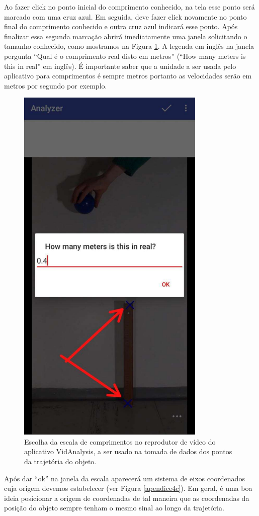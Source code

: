 \documentclass[12pt]{article}
\begin{document}
 Ao fazer click no ponto inicial do comprimento conhecido, na tela esse ponto será marcado com uma cruz azul. Em seguida, deve fazer click novamente no ponto final do comprimento conhecido e outra cruz azul indicará esse ponto. Após finalizar essa segunda marcação abrirá imediatamente uma janela solicitando o tamanho conhecido, como mostramos na Figura \ref{apendice3c}. A legenda em inglês na janela pergunta ``Qual é o comprimento real disto em metros'' (``How many meters is this in real'' em inglês). É importante saber que a unidade a ser usada pelo aplicativo para comprimentos é sempre metros portanto as velocidades serão em metros por segundo por exemplo.
\begin{figure}[h!]
\includegraphics[width=9cm]{imagenapendicec3.pdf}
\caption{Escolha da escala de comprimentos no reprodutor de vídeo do aplicativo VidAnalysis, a ser usado na tomada de dados dos pontos da trajetória do objeto.}
\label{apendice3c}
\end{figure}
Após dar ``ok'' na janela da escala aparecerá um sistema de eixos coordenados cuja origem devemos estabelecer (ver Figura  \ref{apendice4c}). Em geral, é uma boa ideia posicionar a origem de coordenadas de tal maneira que as coordenadas da posição do objeto sempre tenham o mesmo sinal ao longo da trajetória.
\end{document}

